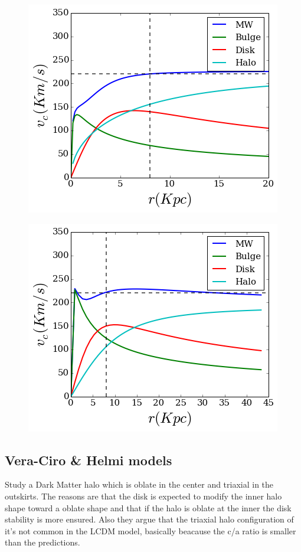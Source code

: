 \begin{figure}[H]\label{MWBesla07}
\centering
\includegraphics[scale=0.7]{../figures/MWBEsla07.png}
\end{figure}



\begin{figure}[H]\label{MWLM10}
\centering
\includegraphics[scale=0.7]{../figures/MWLM10.png}
\end{figure}

\subsection{Vera-Ciro \& Helmi models}

\citep{Vera13} Study a Dark Matter halo which is oblate in the center
and triaxial in the outskirts. The reasons are that the disk is expected
to modify the inner halo shape toward a oblate shape and that if the 
halo is oblate at the inner the disk stability is more ensured. Also 
they argue that the triaxial halo configuration of \citep{Law10} it's 
not common in the LCDM model, basically beacause the c/a ratio is smaller
than the predictions.   

